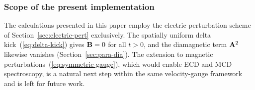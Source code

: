 \subsubsection{Scope of the present implementation}
\label{sec:scope}

The calculations presented in this paper employ the electric
perturbation scheme of Section~\ref{sec:electric-pert} exclusively.
The spatially uniform delta kick~(\ref{eq:delta-kick}) gives
$\mathbf{B}=0$ for all $t>0$, and the diamagnetic term $\mathbf{A}^2$ likewise
vanishes (Section~\ref{sec:para-dia}).
The extension to magnetic perturbations~(\ref{eq:symmetric-gauge}),
which would enable ECD and MCD spectroscopy, is a natural next step
within the same velocity-gauge framework and is left for future
work.
